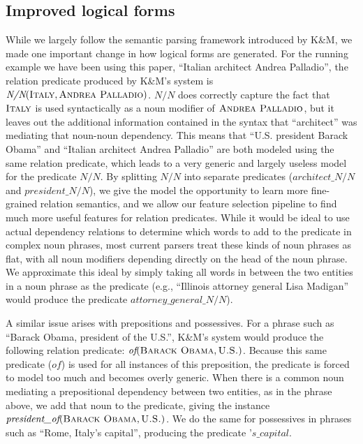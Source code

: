\documentclass[11pt]{article}
\newcommand{\lexicalpredicate}[1]{\ensuremath{\textit{#1}}}
\newcommand{\entity}[1]{\ensuremath{\textsc{#1}}}
\begin{document}
\subsection{Improved logical forms}
\label{sec:better-lfs}

While we largely follow the semantic parsing framework introduced by K\&M, we
made one important change in how logical forms are generated.  For the running
example we have been using this paper, ``Italian architect Andrea Palladio'',
the relation predicate produced by K\&M's system is
$\lexicalpredicate{N/N}(\entity{Italy}, \entity{Andrea Palladio})$.
\lexicalpredicate{N/N}
does correctly capture the fact that \entity{Italy} is used syntactically as a
noun modifier of \entity{Andrea Palladio}, but it leaves out the additional
information contained in the syntax that ``architect'' was mediating that
noun-noun dependency.  This means that ``U.S. president Barack Obama'' and
``Italian architect Andrea Palladio'' are both modeled using the same relation
predicate, which leads to a very generic and largely useless model for the
predicate \lexicalpredicate{N/N}.  By splitting \lexicalpredicate{N/N} into separate
predicates (\lexicalpredicate{architect\_N/N} and \lexicalpredicate{president\_N/N}), we give
the model the opportunity to learn more fine-grained relation semantics, and we
allow our feature selection pipeline to find much more useful features for
relation predicates.  While it would be ideal to use actual dependency
relations to determine which words to add to the predicate in complex noun
phrases, most current parsers treat these kinds of noun phrases as flat, with
all noun modifiers depending directly on the head of the noun phrase.  We
approximate this ideal by simply taking all words in between the two entities
in a noun phrase as the predicate (e.g., ``Illinois attorney general Lisa
Madigan'' would produce the predicate \lexicalpredicate{attorney\_general\_N/N}).

A similar issue arises with prepositions and possessives.  For a phrase such as
``Barack Obama, president of the U.S.'', K\&M's system would produce the
following relation predicate: $\lexicalpredicate{of}(\entity{Barack Obama},
\entity{U.S.})$.  Because this same predicate (\lexicalpredicate{of}) is used for all
instances of this preposition, the predicate is forced to model too much and
becomes overly generic.  When there is a common noun mediating a prepositional
dependency between two entities, as in the phrase above, we add that noun to
the predicate, giving the instance $\lexicalpredicate{president\_of}(\entity{Barack
Obama}, \entity{U.S.})$.  We do the same for possessives in phrases such as
``Rome, Italy's capital'', producing the predicate \lexicalpredicate{'s\_capital}.
\end{document}
